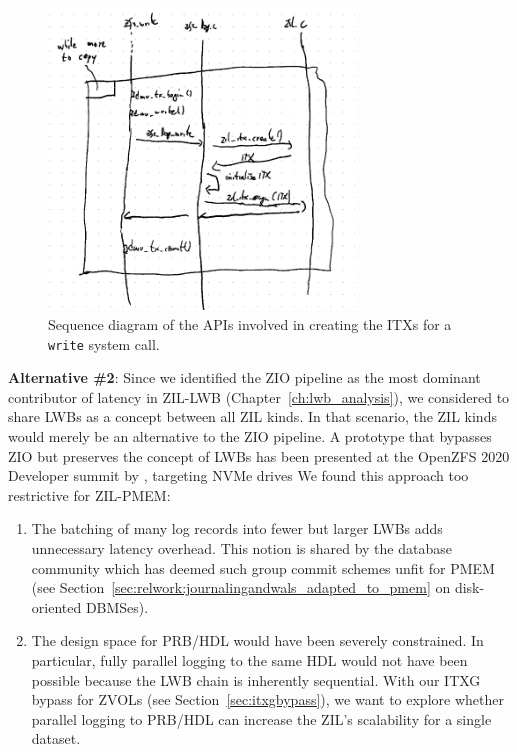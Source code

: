 \documentclass[12pt,a4paper,twoside]{book}
\begin{document}
\begin{figure}[H]
    \centering
    \includegraphics[height=8cm]{fig/zfs_log_write_sequence_diagram}
    \caption{Sequence diagram of the APIs involved in creating the ITXs for a \lstinline{write} system call.}
    \label{fig:zfs_log_write_sequence_diagram}
\end{figure}

\textbf{Alternative \#2}: Since we identified the ZIO pipeline as the most dominant contributor of latency in ZIL-LWB (Chapter~\ref{ch:lwb_analysis}), we considered to share LWBs as a concept between all ZIL kinds.
In that scenario, the ZIL kinds would merely be an alternative to the ZIO pipeline.
A prototype that bypasses ZIO but preserves the concept of LWBs has been presented at the OpenZFS 2020 Developer summit by \citeauthor{openzfsZILPerformanceImprovements2020}, targeting NVMe drives \cite{openzfsZILPerformanceImprovements2020}
We found this approach too restrictive for ZIL-PMEM:
\begin{enumerate}[noitemsep]
    \item The batching of many log records into fewer but larger LWBs adds unnecessary latency overhead.
        This notion is shared by the database community which has deemed such group commit schemes unfit for PMEM (see Section~\ref{sec:relwork:journalingandwals_adapted_to_pmem} on disk-oriented DBMSes).
    \item The design space for PRB/HDL would have been severely constrained.
        In particular, fully parallel logging to the same HDL would not have been possible because the LWB chain is inherently sequential.
        With our ITXG bypass for ZVOLs (see Section~\ref{sec:itxgbypass}), we want to explore whether parallel logging to PRB/HDL can increase the ZIL's scalability for a single dataset.
\end{enumerate}
\end{document}
